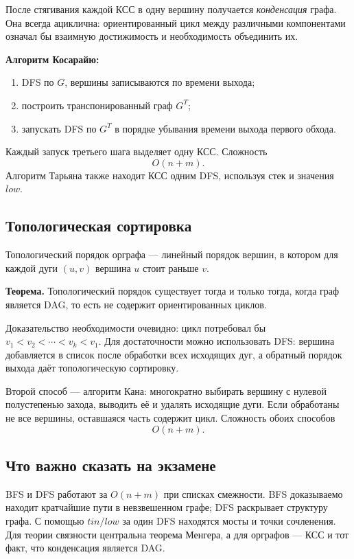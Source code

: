 После стягивания каждой КСС в одну вершину получается \emph{конденсация} графа.
Она всегда ациклична: ориентированный цикл между различными компонентами означал
бы взаимную достижимость и необходимость объединить их.

\textbf{Алгоритм Косарайю:}
\begin{enumerate}
 \item DFS по $G$, вершины записываются по времени выхода;
 \item построить транспонированный граф $G^T$;
 \item запускать DFS по $G^T$ в порядке убывания времени выхода первого обхода.
\end{enumerate}
Каждый запуск третьего шага выделяет одну КСС. Сложность
\[
    O(n+m).
\]
Алгоритм Тарьяна также находит КСС одним DFS, используя стек и значения $low$.

\subsection{Топологическая сортировка}

Топологический порядок орграфа --- линейный порядок вершин, в котором для каждой
дуги $(u,v)$ вершина $u$ стоит раньше $v$.

\textbf{Теорема.} Топологический порядок существует тогда и только тогда, когда
граф является DAG, то есть не содержит ориентированных циклов.

Доказательство необходимости очевидно: цикл потребовал бы
$v_1<v_2<\cdots<v_k<v_1$. Для достаточности можно использовать DFS: вершина
добавляется в список после обработки всех исходящих дуг, а обратный порядок
выхода даёт топологическую сортировку.

Второй способ --- алгоритм Кана: многократно выбирать вершину с нулевой
полустепенью захода, выводить её и удалять исходящие дуги. Если обработаны не все
вершины, оставшаяся часть содержит цикл. Сложность обоих способов
\[
    O(n+m).
\]

\subsection{Что важно сказать на экзамене}

BFS и DFS работают за $O(n+m)$ при списках смежности. BFS доказываемо находит
кратчайшие пути в невзвешенном графе; DFS раскрывает структуру графа. С помощью
$tin/low$ за один DFS находятся мосты и точки сочленения. Для теории связности
центральна теорема Менгера, а для орграфов --- КСС и тот факт, что конденсация
является DAG.

\newpage
